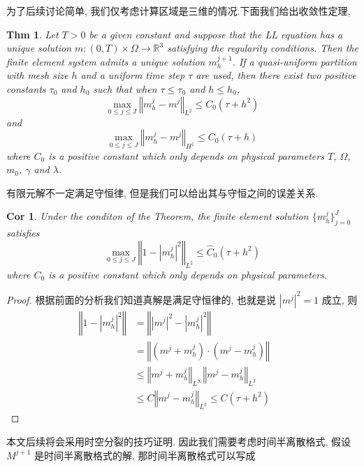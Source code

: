 \documentclass[UTF8,a4paper]{article}
\newtheorem{Theorem}{Thm}[section]
\newtheorem{Corollary}{Cor}[section]
\begin{document}
为了后续讨论简单, 我们仅考虑计算区域是三维的情况.下面我们给出收敛性定理,
\begin{Theorem}
  Let $T>0$ be a given constant and suppose that the LL equation has a unique solution $m:(0,T)\times\Omega\to \mathbb{R}^3$ satisfying the regularity conditions. Then the finite element system admits a unique solution $m_h^{j+1}$. If a quasi-uniform partition with mesh size $h$ and a uniform time step $\tau$ are used, then there exist two positive constants $\tau_0$ and $h_0$ such that when $\tau\leq\tau_0$ and $h\leq h_0$,
\begin{equation*}
\max_{0\leq j\leq J}\left\Vert m_h^j-m^j\right\Vert_{L^2}\leq C_0(\tau+h^2)
\end{equation*}
and
\begin{equation*}
\max_{0\leq j\leq J}\left\Vert m_h^j-m^j\right\Vert_{H^1}\leq C_0(\tau+h)
\end{equation*}
where $C_0$ is a positive constant which only depends on physical parameters $T$, $\Omega$, $m_0$, $\gamma$ and $\lambda$.
\end{Theorem}
有限元解不一定满足守恒律, 但是我们可以给出其与守恒之间的误差关系.
\begin{Corollary}
  Under the conditon of the Theorem, the finite element solution $\{m_h^j\}_{j=0}^J$ satisfies 
\begin{equation*}
\max_{0\leq j\leq J}\left\Vert 1-\left| m_h^j \right|^{2}\right\Vert_{L^2}\leq \hat{C}_0(\tau+h^{2})
\end{equation*}
where $C_0$ is a positive constant which only depends on physical parameters.
\end{Corollary}
\begin{proof}
  根据前面的分析我们知道真解是满足守恒律的, 也就是说 $\left| m^j \right|^2=1$ 成立, 则
\begin{equation*}
\begin{aligned}
\left\Vert 1-\left| m_h^j \right|^2\right\Vert & =\left\Vert \left| m^j \right|^2-\left| m_h^j \right| ^{2}\right\Vert&&\\ 
  & =\left\Vert (m^j+m_h^j)\cdot(m^j-m_h^j)\right\Vert&&\\
  & \leq \left\Vert m^j+m_h^j\right\Vert_{L^{\infty}}\left\Vert m^j-m_h^j\right\Vert _{L^2}&&\\
  & \leq C\left\Vert m^j-m_h^j\right\Vert _{L^2}\leq C(\tau+h^2)&&
\end{aligned}
\end{equation*}
\end{proof}
本文后续将会采用时空分裂的技巧证明. 因此我们需要考虑时间半离散格式, 假设 $M^{j+1}$ 是时间半离散格式的解, 那时间半离散格式可以写成
\end{document}
